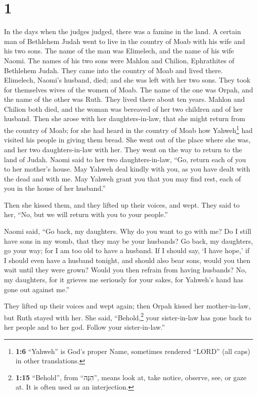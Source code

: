 \hypertarget{section}{%
\section{1}\label{section}}

 In the days when the judges judged, there was a famine in
the land. A certain man of Bethlehem Judah went to live in the country
of Moab with his wife and his two sons.  The name of the
man was Elimelech, and the name of his wife Naomi. The names of his two
sons were Mahlon and Chilion, Ephrathites of Bethlehem Judah. They came
into the country of Moab and lived there.  Elimelech,
Naomi's husband, died; and she was left with her two sons.
 They took for themselves wives of the women of Moab. The
name of the one was Orpah, and the name of the other was Ruth. They
lived there about ten years.  Mahlon and Chilion both
died, and the woman was bereaved of her two children and of her husband.
 Then she arose with her daughters-in-law, that she might
return from the country of Moab; for she had heard in the country of
Moab how Yahweh\footnote{\textbf{1:6} ``Yahweh'' is God's proper Name,
  sometimes rendered ``LORD'' (all caps) in other translations.} had
visited his people in giving them bread.  She went out of
the place where she was, and her two daughters-in-law with her. They
went on the way to return to the land of Judah.  Naomi
said to her two daughters-in-law, ``Go, return each of you to her
mother's house. May Yahweh deal kindly with you, as you have dealt with
the dead and with me.  May Yahweh grant you that you may
find rest, each of you in the house of her husband.''

Then she kissed them, and they lifted up their voices, and wept.
 They said to her, ``No, but we will return with you to
your people.''

 Naomi said, ``Go back, my daughters. Why do you want to
go with me? Do I still have sons in my womb, that they may be your
husbands?  Go back, my daughters, go your way; for I am
too old to have a husband. If I should say, `I have hope,' if I should
even have a husband tonight, and should also bear sons, 
would you then wait until they were grown? Would you then refrain from
having husbands? No, my daughters, for it grieves me seriously for your
sakes, for Yahweh's hand has gone out against me.''

 They lifted up their voices and wept again; then Orpah
kissed her mother-in-law, but Ruth stayed with her.  She
said, ``Behold,\footnote{\textbf{1:15} ``Behold'', from ``הִנֵּה'',
  means look at, take notice, observe, see, or gaze at. It is often used
  as an interjection.} your sister-in-law has gone back to her people
and to her god. Follow your sister-in-law.''

